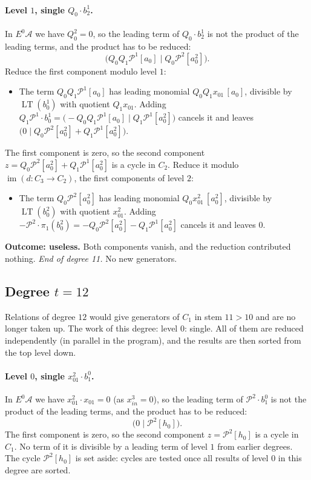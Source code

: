 \documentclass[11pt]{article}
\renewcommand{\P}{\mathcal{P}}
\newcommand{\A}{\mathcal{A}}
\DeclareMathOperator{\LT}{LT}
\begin{document}
\paragraph{Level $1$, single $Q_{0}\cdot b^{1}_{2}$.} In $E^0\A$ we have $Q_{0}^2 = 0$, so the leading term of $Q_{0}\cdot b^{1}_{2}$ is not the product of the leading terms, and the product has to be reduced:
\[\bigl(Q_{0}Q_{1}\P^{1}[a_0] \;\big|\; Q_{0}\P^{2}[a_0^2]\bigr).\]
Reduce the first component modulo level $1$:
\begin{itemize}
\item The term $Q_{0}Q_{1}\P^{1}[a_0]$ has leading monomial $Q_{0}Q_{1}x_{01}\,[a_0]$, divisible by $\LT(b^{1}_{0})$ with quotient $Q_{1}x_{01}$. Adding $Q_{1}\P^{1}\cdot b^{1}_{0} = \bigl(-Q_{0}Q_{1}\P^{1}[a_0] \;\big|\; Q_{1}\P^{1}[a_0^2]\bigr)$ cancels it and leaves $\bigl(0 \;\big|\; Q_{0}\P^{2}[a_0^2] + Q_{1}\P^{1}[a_0^2]\bigr)$.
\end{itemize}
The first component is zero, so the second component $z = Q_{0}\P^{2}[a_0^2] + Q_{1}\P^{1}[a_0^2]$ is a cycle in $C_{2}$.
Reduce it modulo $\operatorname{im}(d\colon C_{3}\to C_{2})$, the first components of level $2$:
\begin{itemize}
\item The term $Q_{0}\P^{2}[a_0^2]$ has leading monomial $Q_{0}x_{01}^{2}\,[a_0^2]$, divisible by $\LT(b^{2}_{0})$ with quotient $x_{01}^{2}$. Adding $-\P^{2}\cdot \pi_1(b^{2}_{0}) = -Q_{0}\P^{2}[a_0^2] - Q_{1}\P^{1}[a_0^2]$ cancels it and leaves $0$.
\end{itemize}
\textbf{Outcome: useless.} Both components vanish, and the reduction contributed nothing.
\medskip\noindent\emph{End of degree 11.} No new generators.
\subsection*{Degree $t = 12$}
\noindent Relations of degree $12$ would give generators of $C_1$ in stem $11 > 10$ and are no longer taken up.
\noindent The work of this degree: level $0$: single. All of them are reduced independently (in parallel in the program), and the results are then sorted from the top level down.
\medskip
\paragraph{Level $0$, single $x_{01}^{2}\cdot b^{0}_{1}$.} In $E^0\A$ we have $x_{01}^{2}\cdot x_{01} = 0$ (as $x_{in}^{3} = 0$), so the leading term of $\P^{2}\cdot b^{0}_{1}$ is not the product of the leading terms, and the product has to be reduced:
\[\bigl(0 \;\big|\; \P^{2}[h_0]\bigr).\]
The first component is zero, so the second component $z = \P^{2}[h_0]$ is a cycle in $C_{1}$.
No term of it is divisible by a leading term of level $1$ from earlier degrees.
The cycle $\P^{2}[h_0]$ is set aside: cycles are tested once all results of level $0$ in this degree are sorted.
\medskip
\end{document}
